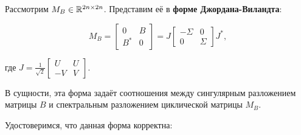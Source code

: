 
Рассмотрим \(M_B \in \mathbb{R}^{2n \times 2n}\). Представим её в \textbf{форме Джордана-Виландта}:

\begin{equation} \label{D-V-eigen}
    M_B= \begin{bmatrix}
        0 & B \\
        B^* & 0
    \end{bmatrix} = J
    \begin{bmatrix}
        -\Sigma & 0 \\
        0 & \Sigma
    \end{bmatrix} J^*,
\end{equation}

где \(J= \frac{1}{\sqrt{2}}\begin{bmatrix}
    U & U \\
    -V & V
\end{bmatrix}\).

В сущности, эта форма задаёт соотношения между сингулярным разложением матрицы \(B\) и спектральным разложением циклической матрицы \(M_B\).

Удостоверимся, что данная форма корректна:

